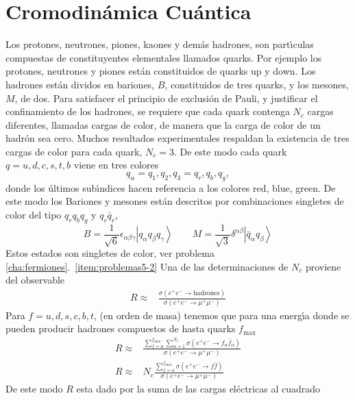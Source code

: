 \section{Cromodin\'amica Cu\'antica}
\label{sec:inter-fuert}
Los protones, neutrones, piones, kaones y dem\'as hadrones, son part\'\i culas compuestas de constituyentes elementales llamados quarks. Por ejemplo los protones, neutrones y piones est\'an constituidos de quarks up y down. Los hadrones est\'an dividos en  bariones, $B$, constituidos de tres quarks, y los mesones, $M$, de dos. Para satisfacer el principio de exclusi\'on de Pauli, y justificar el confinamiento de los hadrones, se requiere que cada quark contenga $N_c$ cargas diferentes, llamadas cargas de color, de manera que la carga de color de un hadr\'on sea cero. Muchos resultados experimentales respaldan la existencia de tres cargas de color para cada quark, $N_c=3$. De este modo cada quark $q=u,d,c,s,t,b$ viene en tres colores
\begin{equation}
  q_\alpha=q_1,q_2,q_3=q_r,q_b,q_g,
\end{equation}
donde los \'ultimos sub\'\i ndices hacen referencia a los colores red, blue, green. De este modo los Bariones y mesones est\'an descritos por combinaciones singletes de color del tipo $q_r q_b q_g$ y $q_r\bar{q}_r$,
\begin{equation}
\label{eq:199}
  B=\frac{1}{\sqrt{6}}\epsilon_{\alpha\beta\gamma}
  \left|q_\alpha q_\beta q_\gamma\right\rangle \qquad M=\frac{1}{\sqrt{3}}\delta^{\alpha\beta}\left|\bar{q}_{\alpha}q_\beta\right\rangle
\end{equation}
Estos estados son singletes de color, ver problema \ref{cha:fermiones}.~\ref{item:problemas5-2}
Una de las determinaciones de $N_c$ proviene del observable
\begin{align}
  R\approx&\frac{\sigma(e^+e^-\to\text{hadrones})}{\sigma(e^+e^-\to\mu^+\mu^-)}
\end{align}
Para $f=u,d,s,c,b,t$, (en orden de masa) tenemos que para una energ\'\i a donde se pueden producir hadrones compuestos de hasta  quarks $f_{\text{max}}$
\begin{align}
  R\approx&\frac{\sum_{f=u}^{f_{\text{max}}}\sum_{\alpha=1}^{N_c}\sigma(e^+e^-\to f_\alpha\bar{f}_\alpha)}{\sigma(e^+e^-\to\mu^+\mu^-)}\nonumber\\
  R\approx&N_c\frac{\sum_{f=u}^{f_{\text{max}}}\sigma(e^+e^-\to f\bar{f})}{\sigma(e^+e^-\to\mu^+\mu^-)}
\end{align}
De este modo $R$ esta dado por la suma de las cargas el\'ectricas al cuadrado
